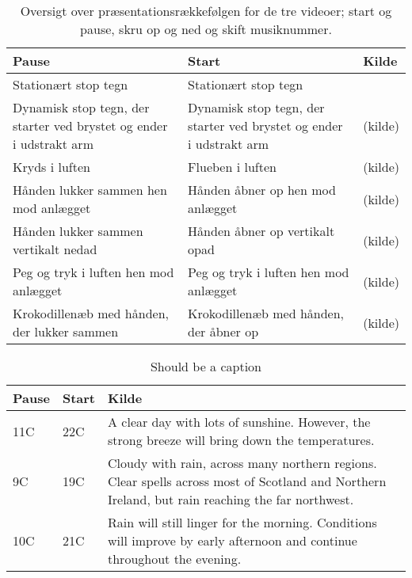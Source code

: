 \begin{table}[H]
	\centering
	\begin{tabular}{| p{4cm} | p{4cm} | p{4cm} |}
		\hline
		\textbf{Pause} & \textbf{Start} & \textbf{Kilde} \\ \hline
		Stationært stop tegn & Stationært stop tegn & \parencite{PDF:ComparingInputModalities} \\ \hline
		Dynamisk stop tegn, der starter ved brystet og ender i udstrakt arm  & Dynamisk stop tegn, der starter ved brystet og ender i udstrakt arm & (kilde) \\ \hline
		Kryds i luften & Flueben i luften & (kilde) \\ \hline
		Hånden lukker sammen hen mod anlægget & Hånden åbner op hen mod anlægget & (kilde)\\ \hline
		Hånden lukker sammen vertikalt nedad & Hånden åbner op vertikalt opad & (kilde) \\ \hline
		Peg og tryk i luften hen mod anlægget & Peg og tryk i luften hen mod anlægget & (kilde) \\ \hline
		Krokodillenæb med hånden, der lukker sammen & Krokodillenæb med hånden, der åbner op & (kilde) \\ \hline
	\end{tabular}
	\caption{Oversigt over præsentationsrækkefølgen for de tre videoer; start og pause, skru op og ned og skift musiknummer.}
	\label{tab:IndsamledeGestikkerPause}
\end{table}
\noindent





\begin{table}[H]
\begin{center}
    \begin{tabular}{ | p{4cm} | p{4cm} | p{4cm} |}
    \hline
    \textbf{Pause} & \textbf{Start} & \textbf{Kilde} \\ \hline
    11C & 22C & A clear day with lots of sunshine.  
    However, the strong breeze will bring down the temperatures. \\ \hline
    9C & 19C & Cloudy with rain, across many northern regions. Clear spells 
    across most of Scotland and Northern Ireland, 
    but rain reaching the far northwest. \\ \hline
    10C & 21C & Rain will still linger for the morning. 
    Conditions will improve by early afternoon and continue 
    throughout the evening. \\ \hline
    \end{tabular}
     \caption {Should be a caption}
     \label{tab:}
\end{center}
\end{table}


